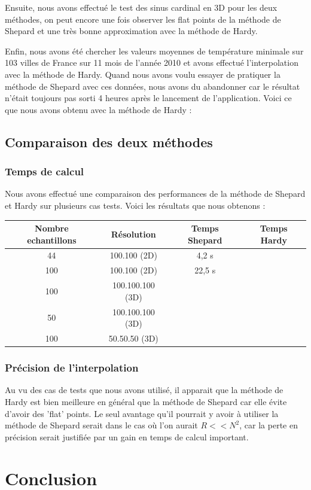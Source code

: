 \documentclass[a4paper,9pt]{article}
\begin{document}
Ensuite, nous avons effectué le test des sinus cardinal en 3D pour les deux méthodes, on peut encore une fois observer les flat points de la méthode de Shepard et une très bonne approximation avec la méthode de Hardy.

Enfin, nous avons été chercher les valeurs moyennes de température minimale sur 103 villes de France sur 11 mois de l'année 2010 et avons effectué l'interpolation avec la méthode de Hardy. Quand nous avons voulu essayer de pratiquer la méthode de Shepard avec ces données, nous avons du abandonner car le résultat n'était toujours pas sorti 4 heures après le lancement de l'application. Voici ce que nous avons obtenu avec la méthode de Hardy :

\subsection{Comparaison des deux méthodes}
\label{subsec:comparaison_methodes}

\subsubsection{Temps de calcul}
\label{subsec:temps_calcul}
Nous avons effectué une comparaison des performances de la méthode de Shepard et Hardy sur plusieurs cas tests. Voici les résultats que nous obtenons :

\begin{tabular}{|c|c|c|c|}
\hline
Nombre echantillons & Résolution & Temps Shepard & Temps Hardy \\
\hline
44 & 100.100 (2D) & 4,2 s & \\
100 & 100.100 (2D) & 22,5 s & \\
100 & 100.100.100 (3D) & & \\
50 & 100.100.100 (3D) & & \\
100 & 50.50.50 (3D) & & \\
\hline
\end{tabular}

\subsubsection{Précision de l'interpolation}
\label{subsec:precision_interpolation}
Au vu des cas de tests que nous avons utilisé, il apparait que la méthode de Hardy est bien meilleure en général que la méthode de Shepard car elle évite d'avoir des 'flat' points. Le seul avantage qu'il pourrait y avoir à utiliser la méthode de Shepard serait dans le cas où l'on aurait $R<<N^{2}$, car la perte en précision serait justifiée par un gain en temps de calcul important.

\section{Conclusion}
\label{sec:conclusion}
\end{document}
